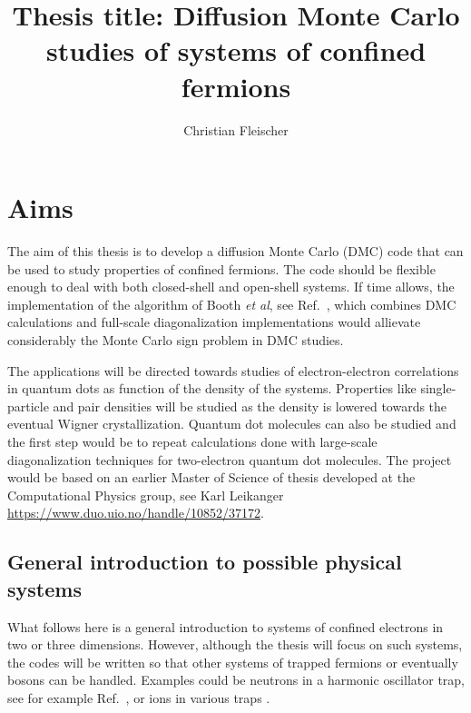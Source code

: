 \documentclass[twocolumn]{revtex4}
\begin{document}
\title{Thesis title: Diffusion Monte Carlo studies of systems of confined fermions}
\author{Christian Fleischer}
\maketitle
\section*{Aims}
The aim of this thesis is to develop a diffusion Monte Carlo (DMC)
code that can be used to study properties of confined fermions. The
code should be flexible enough to deal with both closed-shell and
open-shell systems.  If time allows, the implementation of the
algorithm of Booth {\em et al}, see Ref.~\cite{booth2009}, which
combines DMC calculations and full-scale diagonalization
implementations  would allievate considerably the Monte Carlo sign
problem in DMC studies. 

The applications will be directed towards studies of electron-electron
correlations in quantum dots as function of the density of the
systems. Properties like single-particle and pair densities will be
studied as the density is lowered towards the eventual Wigner
crystallization.  Quantum dot molecules can also be studied and the
first step would be to repeat calculations done with large-scale
diagonalization techniques for two-electron quantum dot molecules.
The project would be based on an earlier Master of Science of thesis developed at the Computational Physics group, see Karl Leikanger \url{https://www.duo.uio.no/handle/10852/37172}. 

\subsection*{General introduction to possible physical systems}


What follows here is a general introduction to systems of confined
electrons in two or three dimensions.  However, although the thesis
will focus on such systems, the codes will be written so that other
systems of trapped fermions or eventually bosons can be
handled. Examples could be neutrons in a harmonic oscillator trap, see
for example Ref.~\cite{bogner2011}, or ions in various traps
\cite{yoram2008}.
\end{document}
